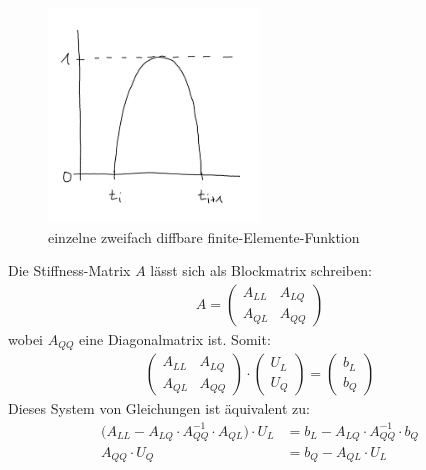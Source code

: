 \begin{figure}[h!]
	\begin{center}
		\includegraphics[width=0.5\textwidth]{./pics/Sketch2.png}
		\caption{einzelne zweifach diffbare finite-Elemente-Funktion}
		\label{AbbFiniteElementeFunktionZweifachDiffbar}
	\end{center}
\end{figure}

Die Stiffness-Matrix $A$ lässt sich als Blockmatrix schreiben:
\begin{align*}
A=\begin{pmatrix}
A_{LL} & A_{LQ}\\
A_{QL} & A_{QQ}
\end{pmatrix}
\end{align*}
wobei $A_{QQ}$ eine Diagonalmatrix ist. Somit:
\begin{align*}
\begin{pmatrix}
A_{LL} & A_{LQ}\\
A_{QL} & A_{QQ}
\end{pmatrix}\cdot\begin{pmatrix}
U_L\\ U_Q
\end{pmatrix}=
\begin{pmatrix}
b_L\\ b_Q
\end{pmatrix}
\end{align*}
Dieses System von Gleichungen ist äquivalent zu:
\begin{align*}
\big(A_{LL}-A_{LQ}\cdot A^{-1}_{QQ}\cdot A_{QL}\big)\cdot U_L&= b_L-A_{LQ}\cdot A^{-1}_{QQ}\cdot b_Q\\
A_{QQ}\cdot U_Q&= b_Q-A_{QL}\cdot U_L
\end{align*}

